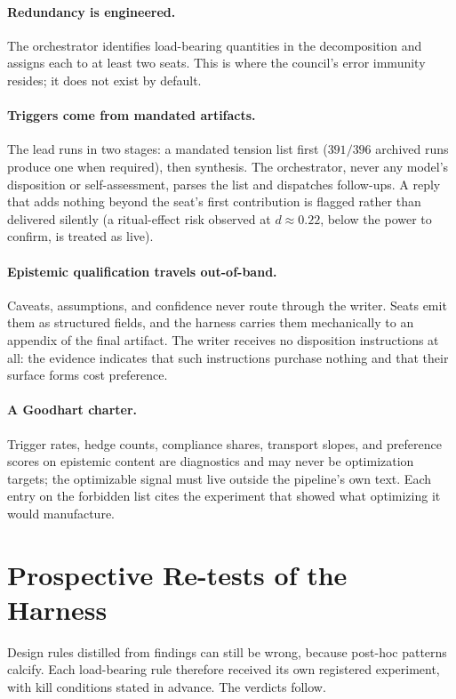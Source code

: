\documentclass[11pt]{article}
\begin{document}
\paragraph{Redundancy is engineered.} The orchestrator identifies
load-bearing quantities in the decomposition and assigns each to at
least two seats. This is where the council's error immunity resides; it
does not exist by default.

\paragraph{Triggers come from mandated artifacts.} The lead runs in two
stages: a mandated tension list first ($391/396$ archived runs produce
one when required), then synthesis. The orchestrator, never any model's
disposition or self-assessment, parses the list and dispatches
follow-ups. A reply that adds nothing beyond the seat's first
contribution is flagged rather than delivered silently (a ritual-effect
risk observed at $d\approx0.22$, below the power to confirm, is treated
as live).

\paragraph{Epistemic qualification travels out-of-band.} Caveats,
assumptions, and confidence never route through the writer. Seats emit
them as structured fields, and the harness carries them mechanically to
an appendix of the final artifact. The writer receives no disposition
instructions at all: the evidence indicates that such instructions
purchase nothing and that their surface forms cost preference.

\paragraph{A Goodhart charter.} Trigger rates, hedge counts, compliance
shares, transport slopes, and preference scores on epistemic content
are diagnostics and may never be optimization targets; the optimizable
signal must live outside the pipeline's own text. Each entry on the
forbidden list cites the experiment that showed what optimizing it
would manufacture.

\section{Prospective Re-tests of the Harness}
\label{sec:retests}

Design rules distilled from findings can still be wrong, because
post-hoc patterns calcify. Each load-bearing rule therefore received its
own registered experiment, with kill conditions stated in advance. The
verdicts follow.
\end{document}
